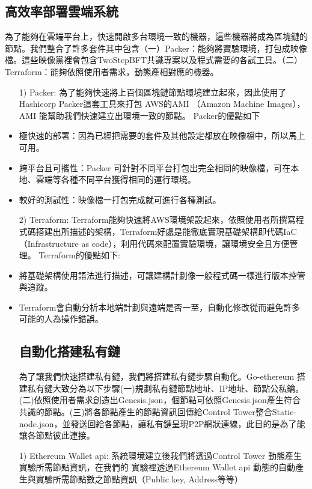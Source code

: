 \subsection{高效率部署雲端系統}\label{se_5} 
為了能夠在雲端平台上，快速開啟多台環境一致的機器，這些機器將成為區塊鏈的節點。我們整合了許多套件其中包含（一）Packer：能夠將實驗環境，打包成映像檔。這些映像黨裡會包含TwoStepBFT共識專案以及程式需要的各試工具。（二）Terraform：能夠依照使用者需求，動態產相對應的機器。
\begin{itemize}%
\item [1)] Packer: 為了能夠快速將上百個區塊鏈節點環境建立起來，因此使用了Hashicorp Packer這套工具來打包 AWS的AMI （Amazon Machine Images），AMI 能幫助我們快速建立出環境一致的節點。
Packer的優點如下

\item 極快速的部署：因為已經把需要的套件及其他設定都放在映像檔中，所以馬上可用。

\item 跨平台且可攜性：Packer 可針對不同平台打包出完全相同的映像檔，可在本地、雲端等各種不同平台獲得相同的運行環境。

\item 較好的測試性：映像檔一打包完成就可進行各種測試。

\item [2)] Terraform: Terraform能夠快速將AWS環境架設起來，依照使用者所撰寫程式碼搭建出所描述的架構，Terraform好處是能徹底實現基礎架構即代碼IaC （Infrastructure as code），利用代碼來配置實驗環境，讓環境安全且方便管理。
Terraform的優點如下:
\item   將基礎架構使用語法進行描述，可讓建構計劃像一般程式碼一樣進行版本控管與追蹤。 

\item Terraform會自動分析本地端計劃與遠端是否一至，自動化修改從而避免許多可能的人為操作錯誤。

\subsection{自動化搭建私有鏈}\label{se_5} 
為了讓我們快速搭建私有鏈，我們將搭建私有鏈步驟自動化。Go-ethereum 搭建私有鏈大致分為以下步驟(一)規劃私有鏈節點地址、IP地址、節點公私鑰。(二)依照使用者需求創造出Genesis.json，個節點可依照Genesis.json產生符合共識的節點。(三)將各節點產生的節點資訊回傳給Control Tower整合Static-node.json，並發送回給各節點，讓私有鏈呈現P2P網狀連線，此目的是為了能讓各節點彼此連接。


\item [1)] Ethereum Wallet api: 系統環境建立後我們將透過Control Tower 動態產生實驗所需節點資訊，在我們的 實驗裡透過Ethereum Wallet api 動態的自動產生與實驗所需節點數之節點資訊（Public key, Address等等）


\end{itemize}
